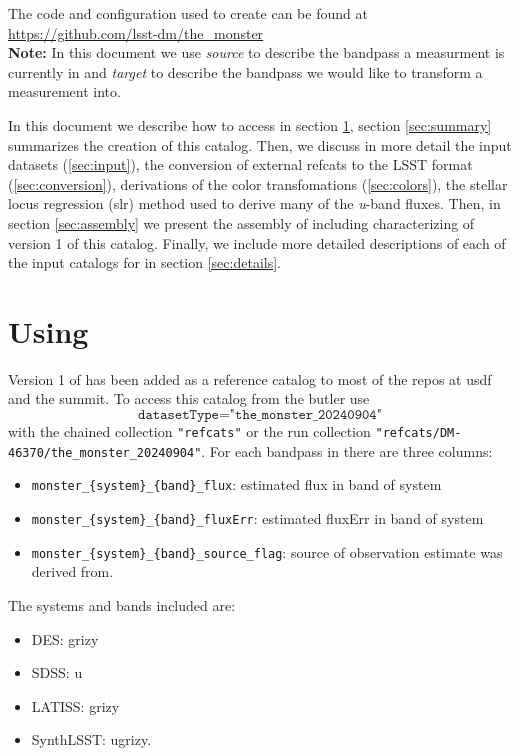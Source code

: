 The code and configuration used to create \monster can be found at \url{https://github.com/lsst-dm/the_monster}\\

\textbf{Note:} In this document we use \emph{source} to describe the bandpass a measurment is currently in and \emph{target} to describe the bandpass we would like to transform a measurement into. 

In this document we describe how to access \monster in section \ref{sec:using}, section \ref{sec:summary} summarizes the creation of this catalog. Then, we discuss in more detail the input datasets (\ref{sec:input}), the 
conversion of external refcats to the LSST format (\ref{sec:conversion}), derivations of the color transfomations (\ref{sec:colors}), the stellar locus regression (slr) method used to derive many of the \emph{u}-band fluxes. 
Then, in section \ref{sec:assembly} we present the assembly of \monster including characterizing of version 1 of this catalog. 
Finally, we include more detailed descriptions of each of the input catalogs for \monster in section \ref{sec:details}. 

\section{Using \monster}
\label{sec:using}
Version 1 of \monster  has been added as a reference catalog to most of the repos at usdf and the summit. 
To access this catalog from the butler use
$$\texttt{datasetType="the\_monster\_20240904"}$$ 
with the chained collection \texttt{"refcats"} or the run collection \texttt{"refcats/DM-46370/the\_monster\_20240904"}. 
For each bandpass in \monster there are three columns: 
\begin{itemize}
    \item \texttt{monster\_\{system\}\_\{band\}\_flux}: estimated flux in band of system 
    \item \texttt{monster\_\{system\}\_\{band\}\_fluxErr}: estimated fluxErr in band of system 
    \item \texttt{monster\_\{system\}\_\{band\}\_source\_flag}: source of observation estimate was derived from.  
\end{itemize}

The systems and bands included are:
\begin{itemize}
    \item DES: grizy
    \item SDSS: u
    \item LATISS: grizy
    \item SynthLSST: ugrizy.
\end{itemize}

